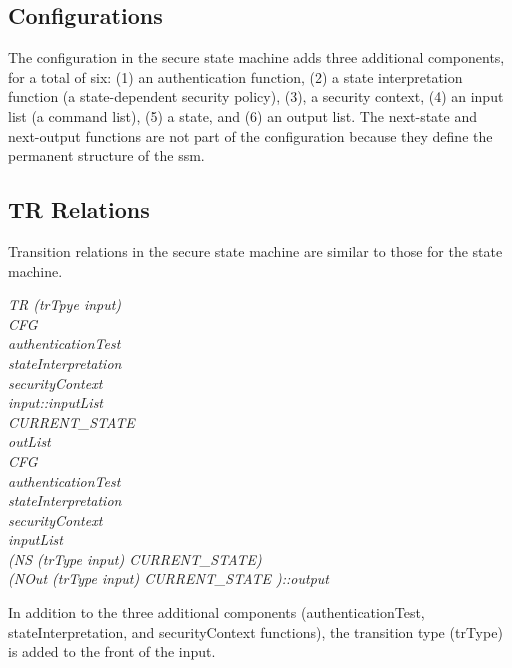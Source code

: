 \documentclass[../../main/main.tex]{subfiles}
\begin{document}
\subsection{Configurations}
The configuration in the secure state machine adds three additional components, for a total of six: (1) an authentication function, (2) a state interpretation function (a state-dependent security policy), (3), a security context, (4) an input list (a command list), (5) a state, and (6) an output list.   The next-state and next-output functions are not part of the configuration because they define the permanent structure of the \gls{ssm}.

\subsection{TR Relations}
Transition relations in the secure state machine are similar to those for the state machine.  

\emph{
TR (trTpye input)\\
CFG \\
\hspace{1cm}authenticationTest\\
\hspace{1cm}stateInterpretation\\
\hspace{1cm}securityContext\\
\hspace{1cm}input::inputList\\
\hspace{1cm}CURRENT_STATE\\
\hspace{1cm}outList\\
CFG\\
\hspace{1cm}authenticationTest\\
\hspace{1cm}stateInterpretation\\
\hspace{1cm}securityContext\\
\hspace{1cm}inputList\\
\hspace{1cm}(NS (trType input) CURRENT_STATE)\\
\hspace{1cm}(NOut (trType input) CURRENT_STATE )::output
}

In addition to the three additional components (authenticationTest, stateInterpretation, and securityContext functions), the transition type (trType) is added to the front of the input. 
\end{document}
